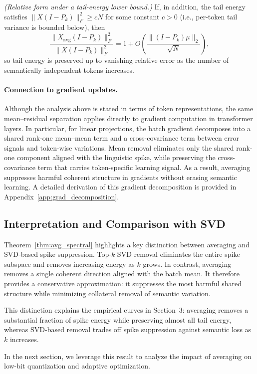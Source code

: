 \begin{theorem}
\begin{enumerate}
\smallskip
\noindent\emph{(Relative form under a tail-energy lower bound.)}
If, in addition, the tail energy satisfies $\|X(I-P_k)\|_F^2 \ge cN$ for some
constant $c>0$ (i.e., per-token tail variance is bounded below), then
\begin{equation}
\label{eq:tail_ratio_cor}
\frac{\|X_{\mathrm{avg}}(I-P_k)\|_F^2}{\|X(I-P_k)\|_F^2}
=
1 + O\!\left(\frac{\|(I-P_k)\mu\|_2}{\sqrt{N}}\right),
\end{equation}
so tail energy is preserved up to vanishing relative error as the number of
semantically independent tokens increases.

\end{enumerate}
\end{theorem}

\paragraph{Connection to gradient updates.}
Although the analysis above is stated in terms of token representations, the same
mean–residual separation applies directly to gradient computation in transformer
layers.
In particular, for linear projections, the batch gradient decomposes into a
shared rank-one mean–mean term and a cross-covariance term between error signals
and token-wise variations.
Mean removal eliminates only the shared rank-one component aligned with the
linguistic spike, while preserving the cross-covariance term that carries
token-specific learning signal.
As a result, averaging suppresses harmful coherent structure in gradients without
erasing semantic learning.
A detailed derivation of this gradient decomposition is provided in
Appendix~\ref{app:grad_decomposition}.

\subsection{Interpretation and Comparison with SVD}

Theorem~\ref{thm:avg_spectral} highlights a key distinction between averaging and
SVD-based spike suppression.
Top-$k$ SVD removal eliminates the entire spike subspace and removes increasing
energy as $k$ grows.
In contrast, averaging removes a single coherent direction aligned with the
batch mean.
It therefore provides a conservative approximation: it suppresses the most
harmful shared structure while minimizing collateral removal of semantic
variation.

This distinction explains the empirical curves in Section~3:
averaging removes a substantial fraction of spike energy while preserving almost
all tail energy, whereas SVD-based removal trades off spike suppression against
semantic loss as $k$ increases.

In the next section, we leverage this result to analyze the impact of averaging
on low-bit quantization and adaptive optimization.